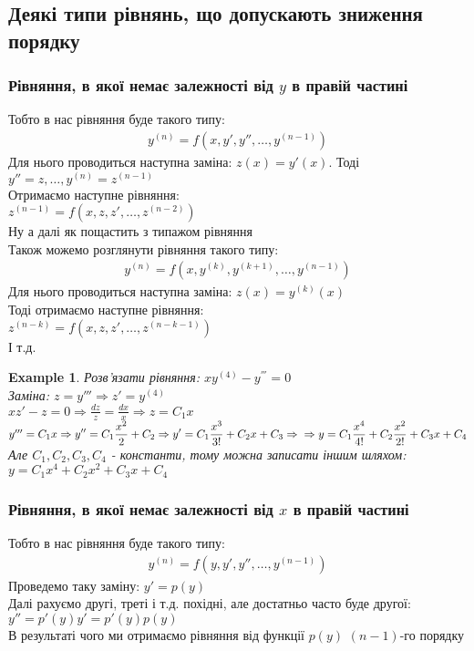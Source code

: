 \documentclass[a4paper, 10pt]{article}
\theoremstyle{theoremdd}
\theoremstyle{theoremdd}
\theoremstyle{theoremdd}
\theoremstyle{theoremdd}
\newtheorem{example}[theorem]{Example}
\theoremstyle{theoremdd}
\theoremstyle{theoremdd}
\theoremstyle{theoremdd}
\theoremstyle{theoremdd}
\begin{document}
	\subsection{Деякі типи рівнянь, що допускають зниження порядку}
	\subsubsection{Рівняння, в якої немає залежності від $y$ в правій частині}
	Тобто в нас рівняння буде такого типу:
	\begin{align*}
	y^{(n)} = f(x,y',y'',\dots, y^{(n-1)})
	\end{align*}
	Для нього проводиться наступна заміна: $z(x) = y'(x)$. Тоді\\
	$y'' = z, \dots, y^{(n)} = z^{(n-1)}$\\
	Отримаємо наступне рівняння:\\
	$z^{(n-1)}=f(x,z,z',\dots,z^{(n-2)})$\\
	Ну а далі як пощастить з типажом рівняння
	\bigskip \\
	Також можемо розглянути рівняння такого типу:
	\begin{align*}
	y^{(n)} = f(x,y^{(k)},y^{(k+1)},\dots, y^{(n-1)})
	\end{align*}
	Для нього проводиться наступна заміна: $z(x) = y^{(k)}(x)$\\
	Тоді отримаємо наступне рівняння:\\
	$z^{(n-k)}=f(x,z,z',\dots,z^{(n-k-1)})$\\
	І т.д.
	
	\begin{example}
 Розв'язати рівняння: $xy^{(4)} - y^{'''}=0$\\
	Заміна: $z = y''' \Rightarrow z' = y^{(4)}$\\
	$xz'-z=0 \Rightarrow \displaystyle \frac{dz}{z} = \frac{dx}{x} \Rightarrow z = C_1x$\\
	$y''' = C_1x \Rightarrow \displaystyle y'' = C_1 \frac{x^2}{2} + C_2 \Rightarrow y' = C_1 \frac{x^3}{3!} + C_2x + C_3 \Rightarrow \\ \Rightarrow y = C_1 \frac{x^4}{4!} + C_2 \frac{x^2}{2!}+ C_3x + C_4$\\
	Але $C_1,C_2,C_3,C_4$ - константи, тому можна записати іншим шляхом:\\
	$y = C_1x^4 + C_2x^2 + C_3x + C_4$
	\end{example}
	
	\subsubsection{Рівняння, в якої немає залежності від $x$ в правій частині}
	Тобто в нас рівняння буде такого типу:
	\begin{align*}
	y^{(n)} = f(y,y',y'',\dots, y^{(n-1)})
	\end{align*}
	Проведемо таку заміну: $y' = p(y)$\\
	Далі рахуємо другі, треті і т.д. похідні, але достатньо часто буде другої:\\
	$y'' = p'(y)y'=p'(y)p(y)$\\
	В результаті чого ми отримаємо рівняння від функції $p(y)$ $(n-1)$-го порядку
	
\end{document}
